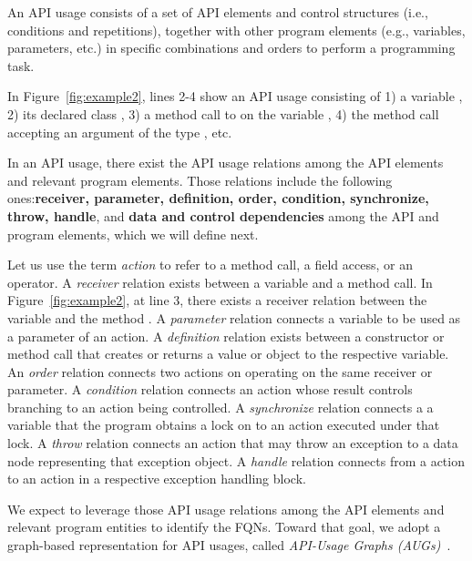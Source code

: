 \begin{Definition}
An API usage consists of a set of API elements and control structures
(i.e., conditions and repetitions), together with other program
elements (e.g., variables, parameters, etc.) in specific combinations
and orders to perform a programming task.
\end{Definition}

In Figure~\ref{fig:example2}, lines 2-4 show an API usage consisting
of 1) a variable , 2) its declared class ,
3) a method call to  on the variable
, 4) the method call  accepting an
argument of the type , etc.

\begin{Definition}
  In an API usage, there exist the API usage relations among the API
  elements and relevant program elements. Those relations include the
  following ones:{\bf receiver, parameter, definition, order,
    condition, synchronize, throw, handle}, and {\bf data and control
    dependencies} among the API and program elements, which we will
  define next.
\end{Definition}

Let us use the term {\em action} to refer to a method call, a field
access, or an operator. A {\em receiver} relation exists between a
variable and a method call. In Figure~\ref{fig:example2},
at line 3, there exists a receiver relation between the variable
 and the method . A {\em
  parameter} relation connects a variable to be used as a parameter of
an action. A {\em definition} relation exists between a constructor or
method call that creates or returns a value or object to the
respective variable. An {\em order} relation connects two actions on
operating on the same receiver or parameter. A {\em condition}
relation connects an action whose result controls branching to an
action being controlled. A {\em synchronize} relation connects a a
variable that the program obtains a lock on to an action executed
under that lock. A {\em throw} relation connects an action that may
throw an exception to a data node representing that exception
object. A {\em handle} relation connects from a  action to
an action in a respective exception handling block.

We expect to leverage those API usage relations among the API elements
and relevant program entities to identify the FQNs. Toward that goal,
we adopt a graph-based representation for API usages, called {\em
  API-Usage Graphs (AUGs)}~\cite{msr19}.

